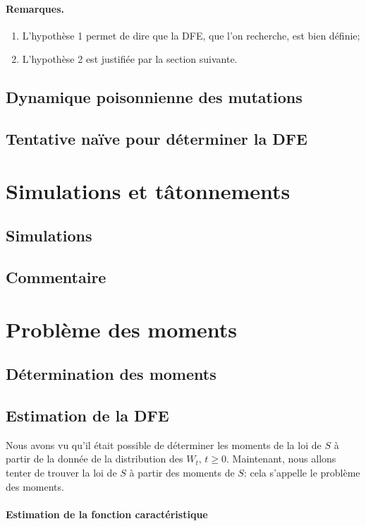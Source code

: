 \documentclass[12pt]{article}
\newcommand{\reqs}[1]{\paragraph{Remarques.}\begin{enumerate}#1\end{enumerate}\vspace{0.1cm}}
\newcommand{\vg}{,\,}
\begin{document}
\reqs{
\item L'hypothèse 1 permet de dire que la DFE, que l'on recherche, est bien définie;
\item L'hypothèse 2 est justifiée par la section suivante.}

\subsection{Dynamique poisonnienne des mutations}



\subsection{Tentative naïve pour déterminer la DFE}




\section{Simulations et tâtonnements}

\subsection{Simulations}

\subsection{Commentaire}


\section{Problème des moments}

\subsection{Détermination des moments}

\subsection{Estimation de la DFE}

Nous avons vu qu'il était possible de déterminer les moments de la loi de $S$ à partir de la donnée de la distribution des $W_t\vg t\geqslant 0$. Maintenant, nous allons tenter de trouver la loi de $S$ à partir des moments de $S$: cela s'appelle le problème des moments.

\paragraph{Estimation de la fonction caractéristique}
\end{document}
